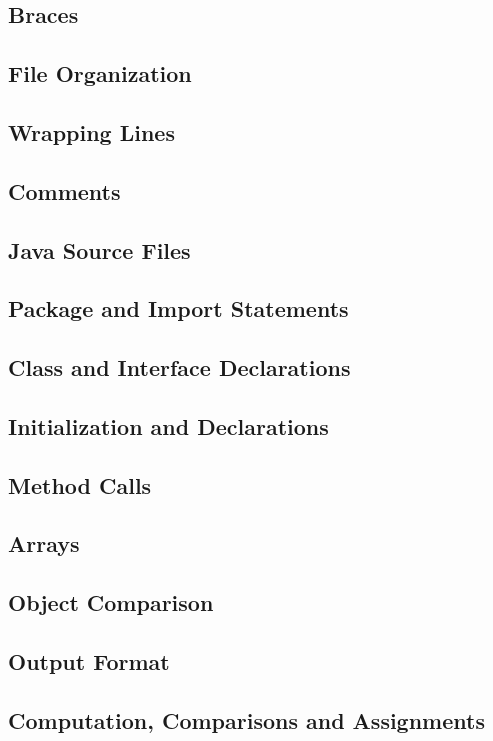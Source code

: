 \documentclass{article}
\begin{document}
\subsection{Braces}
\subsection{File Organization}
\subsection{Wrapping Lines}
\subsection{Comments}
\subsection{Java Source Files}
\subsection{Package and Import Statements}
\subsection{Class and Interface Declarations}
\subsection{Initialization and Declarations}
\subsection{Method Calls}
\subsection{Arrays}
\subsection{Object Comparison}
\subsection{Output Format}
\subsection{Computation, Comparisons and Assignments}
\end{document}
